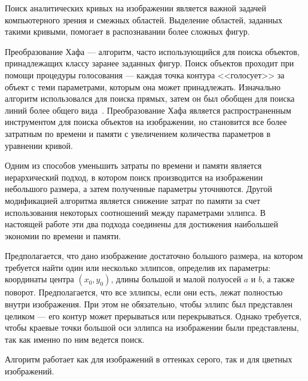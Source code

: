 




%

\tableofcontents
\clearpage

\Intro
Поиск аналитических кривых на изображении является важной задачей компьютерного зрения и смежных областей. Выделение областей, заданных такими кривыми, помогает в распознавании более сложных фигур.

Преобразование Хафа --- алгоритм, часто использующийся для поиска объектов, принадлежащих классу заранее заданных фигур. 
Поиск объектов проходит при помощи процедуры голосования --- каждая точка контура <<голосует>> за объект с теми параметрами, которым она может принадлежать. 
Изначально алгоритм использовался для поиска прямых, затем он был обобщен для поиска линий более общего вида~\autocite{Duda}.
Преобразование Хафа является распространенным инструментом для поиска объектов на изображении, но становится все более затратным по времени и памяти с увеличением количества параметров в уравнении кривой.

Одним из способов уменьшить затраты по времени и памяти является иерархический подход, в котором поиск производится на изображении небольшого размера, а затем полученные параметры уточняются. 
Другой модификацией алгоритма является снижение затрат по памяти за счет использования некоторых соотношений между параметрами эллипса.
В настоящей работе эти два подхода соединены для достижения наибольшей экономии по времени и памяти.

Предполагается, что дано изображение достаточно большого размера, на котором требуется найти один или несколько эллипсов, определив их параметры: 
координаты центра \((x_0, y_0)\), длины большой и малой полуосей \(a\) и \(b\), а также поворот. Предполагается, что все эллипсы, если они есть, лежат 
полностью внутри изображения. При этом не обязательно, чтобы эллипс был представлен целиком --- его контур может прерываться или перекрываться. 
Однако требуется, чтобы краевые точки большой оси эллипса на изображении были представлены, так как именно по ним ведется поиск.  

Алгоритм работает как для изображений в оттенках серого, так и для цветных изображений.

